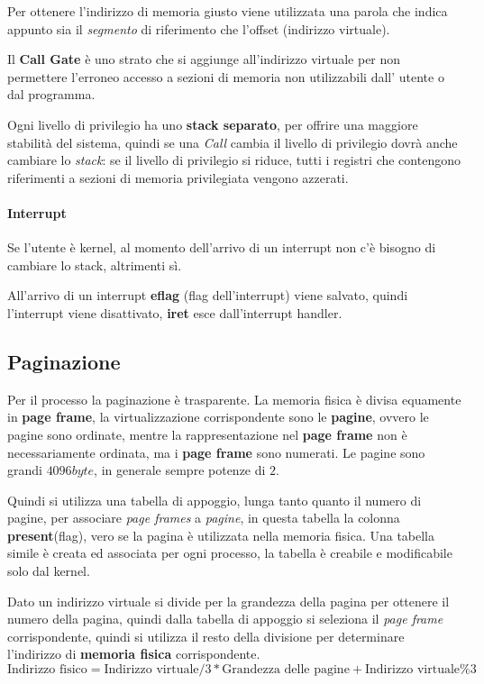 Per ottenere l'indirizzo di memoria giusto viene utilizzata una parola che
indica appunto sia il \emph{segmento} di riferimento che l'offset (indirizzo
virtuale).


Il \textbf{Call Gate} è uno strato che si aggiunge all'indirizzo virtuale per
non permettere l'erroneo accesso a sezioni di memoria non utilizzabili dall'
utente o dal programma.


Ogni livello di privilegio ha uno \textbf{stack separato}, per offrire una
maggiore stabilità del sistema, quindi se una \emph{Call} cambia il livello
di privilegio dovrà anche cambiare lo \emph{stack}: se il livello di privilegio
si riduce, tutti i registri che contengono riferimenti a sezioni di memoria
privilegiata vengono azzerati.

\paragraph{Interrupt}
Se l'utente è kernel, al momento dell'arrivo di un interrupt non c'è bisogno
di cambiare lo stack, altrimenti sì.

All'arrivo di un interrupt \textbf{eflag} (flag dell'interrupt) viene salvato,
quindi l'interrupt viene disattivato, \textbf{iret} esce dall'interrupt
handler.


\subsection{Paginazione}
Per il processo la paginazione è trasparente.
La memoria fisica è divisa equamente in \textbf{page frame}, la
virtualizzazione corrispondente sono le \textbf{pagine}, ovvero le pagine sono
ordinate, mentre la rappresentazione nel \textbf{page frame} non è
necessariamente ordinata, ma i \textbf{page frame} sono numerati.
Le pagine sono grandi $4096byte$, in generale sempre potenze di $2$.


Quindi si utilizza una tabella di appoggio, lunga tanto quanto il numero di
pagine, per associare \emph{page frames} a \emph{pagine}, in questa tabella la
colonna \textbf{present}(flag), vero se la pagina è utilizzata nella memoria
fisica.
Una tabella simile è creata ed associata per ogni processo, la tabella è
creabile e modificabile solo dal kernel.


Dato un indirizzo virtuale si divide per la grandezza della pagina per ottenere
il numero della pagina, quindi dalla tabella di appoggio si seleziona il \emph{
page frame} corrispondente, quindi si utilizza il resto della divisione per
determinare l'indirizzo di \textbf{memoria fisica} corrispondente.
\[
  \text{Indirizzo fisico} = \text{Indirizzo virtuale}/3 * \text{Grandezza delle
  pagine} + \text{Indirizzo virtuale} \% 3 
\]

